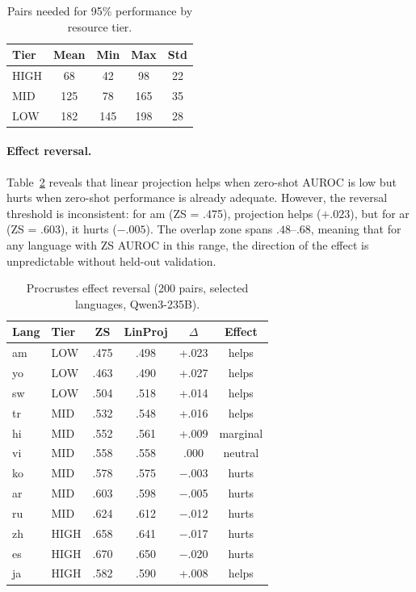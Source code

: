 \documentclass[11pt,a4paper]{article}
\newcommand{\auroc}{AUROC}
\begin{document}
\begin{table}[t]
\centering
\small
\caption{Pairs needed for 95\% performance by resource tier.}
\label{tab:pairs_by_tier}
\begin{tabular}{lcccc}
\toprule
Tier & Mean & Min & Max & Std \\
\midrule
HIGH & 68 & 42 & 98 & 22 \\
MID  & 125 & 78 & 165 & 35 \\
LOW  & 182 & 145 & 198 & 28 \\
\bottomrule
\end{tabular}
\end{table}

\paragraph{Effect reversal.}
Table~\ref{tab:reversal} reveals that linear projection helps when zero-shot \auroc{} is low but hurts when zero-shot performance is already adequate.
However, the reversal threshold is inconsistent: for am (ZS = .475), projection helps ($+.023$), but for ar (ZS = .603), it hurts ($-.005$).
The overlap zone spans $.48$--$.68$, meaning that for any language with ZS \auroc{} in this range, the direction of the effect is unpredictable without held-out validation.

\begin{table}[t]
\centering
\small
\caption{Procrustes effect reversal (200 pairs, selected languages, Qwen3-235B).}
\label{tab:reversal}
\begin{tabular}{llcccc}
\toprule
Lang & Tier & ZS & LinProj & $\Delta$ & Effect \\
\midrule
am & LOW & .475 & .498 & +.023 & helps \\
yo & LOW & .463 & .490 & +.027 & helps \\
sw & LOW & .504 & .518 & +.014 & helps \\
tr & MID & .532 & .548 & +.016 & helps \\
hi & MID & .552 & .561 & +.009 & marginal \\
vi & MID & .558 & .558 & .000 & neutral \\
ko & MID & .578 & .575 & $-$.003 & hurts \\
ar & MID & .603 & .598 & $-$.005 & hurts \\
ru & MID & .624 & .612 & $-$.012 & hurts \\
zh & HIGH & .658 & .641 & $-$.017 & hurts \\
es & HIGH & .670 & .650 & $-$.020 & hurts \\
ja & HIGH & .582 & .590 & +.008 & helps \\
\bottomrule
\end{tabular}
\end{table}
\end{document}

